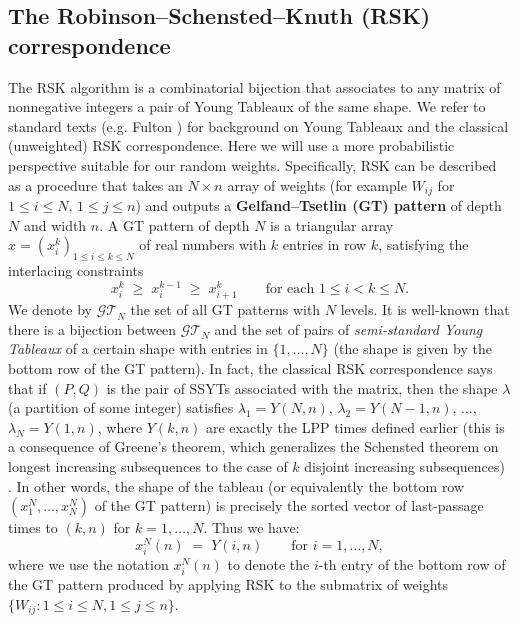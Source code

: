 \documentclass[letterpaper,11pt,oneside,reqno]{article}
\numberwithin{equation}{section}
\theoremstyle{definition}
\begin{document}
\subsection{The Robinson--Schensted--Knuth (RSK) correspondence}
The RSK algorithm is a combinatorial bijection that associates to any matrix of nonnegative integers a pair of Young Tableaux of the same shape. We refer to standard texts (e.g. Fulton \cite{fulton1997young}) for background on Young Tableaux and the classical (unweighted) RSK correspondence. Here we will use a more probabilistic perspective suitable for our random weights. Specifically, RSK can be described as a procedure that takes an $N\times n$ array of weights (for example $W_{ij}$ for $1\le i\le N,\,1\le j\le n$) and outputs a \textbf{Gelfand--Tsetlin (GT) pattern} of depth $N$ and width $n$. A GT pattern of depth $N$ is a triangular array $x=(x_i^k)_{1\le i\le k \le N}$ of real numbers with $k$ entries in row $k$, satisfying the interlacing constraints
\[ x^k_i \;\ge\; x^{k-1}_i \;\ge\; x^k_{i+1} \qquad \text{for each $1\le i < k \le N$.} \]
We denote by $\mathcal{GT}_{N}$ the set of all GT patterns with $N$ levels. It is well-known that there is a bijection between $\mathcal{GT}_N$ and the set of pairs of \emph{semi-standard Young Tableaux} of a certain shape with entries in $\{1,\dots,N\}$ (the shape is given by the bottom row of the GT pattern). In fact, the classical RSK correspondence says that if $(P,Q)$ is the pair of SSYTs associated with the matrix, then the shape $\lambda$ (a partition of some integer) satisfies $\lambda_1 = Y(N,n)$, $\lambda_2 = Y(N-1,n)$, ..., $\lambda_N = Y(1,n)$, where $Y(k,n)$ are exactly the LPP times defined earlier (this is a consequence of Greene's theorem, which generalizes the Schensted theorem on longest increasing subsequences to the case of $k$ disjoint increasing subsequences) \cite{Greene1974, fulton1997young}. In other words, the shape of the tableau (or equivalently the bottom row $(x^N_1,\dots,x^N_N)$ of the GT pattern) is precisely the sorted vector of last-passage times to $(k,n)$ for $k=1,\dots,N$. Thus we have:
\begin{equation}\label{eq:RSK-property}
x^N_i(n) \;=\; Y(i,n)\qquad \text{for $i=1,\dots,N$},
\end{equation}
where we use the notation $x^N_i(n)$ to denote the $i$-th entry of the bottom row of the GT pattern produced by applying RSK to the submatrix of weights $\{W_{ij}: 1\le i\le N, 1\le j\le n\}$.
\end{document}
